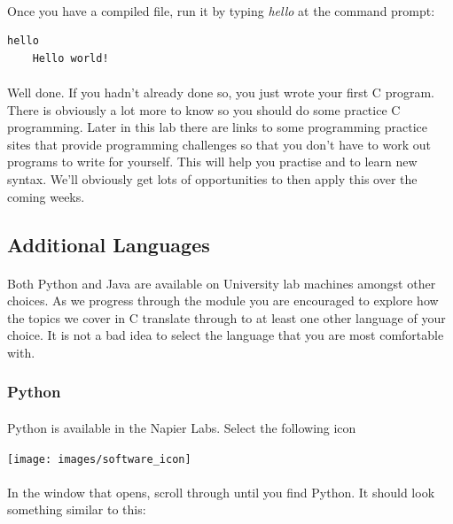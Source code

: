 \documentclass[10pt, a4paper, twosize]{article}
\begin{document}
\paragraph{} Once you have a compiled file, run it by typing \emph{hello} at the command prompt:


\begin{lstlisting}[style=DOS]
    hello
    Hello world!
\end{lstlisting}

\paragraph{} Well done. If you hadn't already done so, you just wrote your first C program. There is obviously a lot more to know so you should do some practice C programming. Later in this lab there are links to some programming practice sites that provide programming challenges so that you don't have to work out programs to write for yourself. This will help you practise and to learn new syntax. We'll obviously get lots of opportunities to then apply this over the coming weeks.

\subsection{Additional Languages}
\paragraph{} Both Python and Java are available on University lab machines amongst other choices. As we progress through the module you are encouraged to explore how the topics we cover in C translate through to at least one other language of your choice. It is not a bad idea to select the language that you are most comfortable with.

\subsubsection{Python}
\paragraph{} Python is available in the Napier Labs. Select the following icon

\texttt{[image: images/software\_icon]}

\paragraph{} In the window that opens, scroll through until you find Python. It should look something similar to this:
\end{document}

